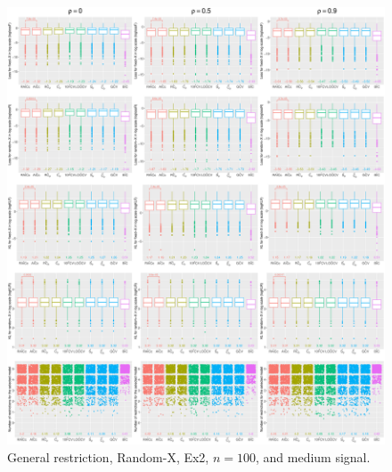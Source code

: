 \clearpage
\begin{figure}[!ht]
\centering
\includegraphics[width=\textwidth]{figures/supplement/randomx/general_restriction/Ex2_n100_msnr.eps}
\caption{General restriction, Random-X, Ex2, $n=100$, and medium signal.}
\end{figure}
\clearpage
